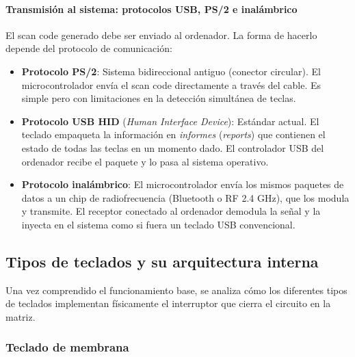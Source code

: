 \documentclass[12pt, letterpaper]{article}
\begin{document}
\paragraph{Transmisión al sistema: protocolos USB, PS/2 e inalámbrico}
El scan code generado debe ser enviado al ordenador. La forma de hacerlo depende del protocolo de comunicación:
\begin{itemize}
    \item \textbf{Protocolo PS/2}: Sistema bidireccional antiguo (conector circular). El microcontrolador envía el scan code directamente a través del cable. Es simple pero con limitaciones en la detección simultánea de teclas.
    \item \textbf{Protocolo USB HID} (\textit{Human Interface Device}): Estándar actual. El teclado empaqueta la información en \textit{informes} (\textit{reports}) que contienen el estado de todas las teclas en un momento dado. El controlador USB del ordenador recibe el paquete y lo pasa al sistema operativo.
    \item \textbf{Protocolo inalámbrico}: El microcontrolador envía los mismos paquetes de datos a un chip de radiofrecuencia (Bluetooth o RF 2.4 GHz), que los modula y transmite. El receptor conectado al ordenador demodula la señal y la inyecta en el sistema como si fuera un teclado USB convencional.
\end{itemize}

\subsection{Tipos de teclados y su arquitectura interna}
Una vez comprendido el funcionamiento base, se analiza cómo los diferentes tipos de teclados implementan físicamente el interruptor que cierra el circuito en la matriz.

\subsubsection{Teclado de membrana}
\end{document}
